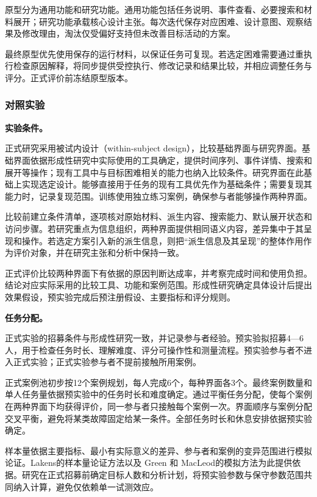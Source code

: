 原型分为通用功能和研究功能。通用功能包括任务说明、事件查看、必要搜索和材料展开；研究功能承载核心设计主张。每次迭代保存对应困难、设计意图、观察结果及修改理由，淘汰仅受偏好支持但未改善目标活动的方案。

最终原型优先使用保存的运行材料，以保证任务可复现。若选定困难需要通过重执行检查原因解释，将同步提供受控执行、修改记录和结果比较，并相应调整任务与评分。正式评价前冻结原型版本。

\subsubsection{对照实验}

\noindent\textbf{实验条件。}

正式研究采用被试内设计（within-subject design），比较基础界面与研究界面。基础界面依据形成性研究中实际使用的工具确定，提供时间序列、事件详情、搜索和展开等操作；现有工具中与目标困难相关的能力也纳入比较条件。研究界面在此基础上实现选定设计。能够直接用于任务的现有工具优先作为基础条件；需要复现其能力时，记录复现范围。训练使用独立练习案例，确保参与者能够操作两种界面。

比较前建立条件清单，逐项核对原始材料、派生内容、搜索能力、默认展开状态和访问步骤。若研究重点为信息组织，两种界面提供相同语义内容，差异集中于其呈现和操作。若选定方案引入新的派生信息，则把“派生信息及其呈现”的整体作用作为评价对象，并在研究主张和分析中保持一致。

正式评价比较两种界面下有依据的原因判断达成率，并考察完成时间和使用负担。结论对应实际采用的比较工具、功能和案例范围。形成性研究确定具体设计后提出效果假设，预实验完成后预注册假设、主要指标和评分规则。

\noindent\textbf{任务分配。}

正式实验的招募条件与形成性研究一致，并记录参与者经验。预实验拟招募4—6人，用于检查任务时长、理解难度、评分可操作性和测量流程。预实验参与者不进入正式实验；正式实验参与者不提前接触所用案例。

正式案例池初步按12个案例规划，每人完成6个，每种界面各3个。最终案例数量和单人任务量依据预实验中的任务时长和难度确定。通过平衡任务分配，使每个案例在两种界面下均获得评价，同一参与者只接触每个案例一次。界面顺序与案例分配交叉平衡，避免将某类故障固定给某一条件。全部任务时长和休息安排依据预实验确定。

样本量依据主要指标、最小有实际意义的差异、参与者和案例的变异范围进行模拟论证。Lakens\cite{ref67}的样本量论证方法以及 Green 和 MacLeod\cite{ref68}的模拟方法为此提供依据。研究在正式招募前确定目标人数和分析计划，将预实验参数与保守参数范围共同纳入计算，避免仅依赖单一试测效应。

